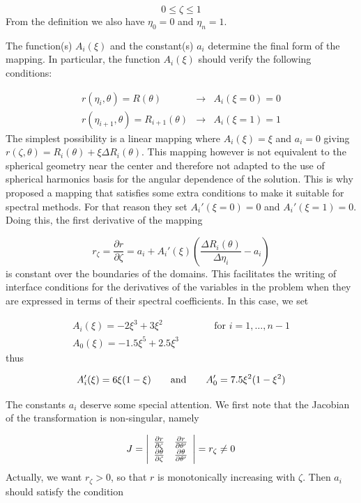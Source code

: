 \[ 0\leq \zeta\leq1\]
From the definition we also have $\eta_0=0$ and $\eta_n=1$.

The function(s) $A_i(\xi)$ and the constant(s) $a_i$ determine the final
form of the mapping. In particular, the function $A_i(\xi)$ should verify
the following conditions:

\begin{eqnarray*}
r(\eta_i,\theta)=R(\theta) &\longrightarrow& A_i(\xi=0)=0\\
r(\eta_{i+1},\theta)=R_{i+1}(\theta) &\longrightarrow& A_i(\xi=1)=1
\end{eqnarray*}
The simplest possibility is a linear mapping where $A_i(\xi)=\xi$ and
$a_i=0$ giving $ r(\zeta,\theta)=R_i(\theta)+\xi\Delta R_i(\theta)$.
This mapping however is not equivalent to the spherical geometry near
the center and therefore not adapted to the use of spherical harmonics
basis for the angular dependence of the solution. This is why 
\citet{BGM98} proposed a mapping that satisfies some
extra conditions to make it suitable for spectral methods. For that
reason they set $A_i'(\xi=0)=0$ and $A_i'(\xi=1)=0$. Doing this, the
first derivative of the mapping

\begin{equation}
r_\zeta=\frac{\partial r}{\partial\zeta}=a_i+A_i'(\xi)\left(\frac{\Delta R_i(\theta)}{\Delta\eta_i}-a_i\right)
\end{equation}
is constant over the boundaries of the domains. This facilitates the
writing of interface conditions for the derivatives of the variables
in the problem when they are expressed in terms of their spectral
coefficients.  In this case, we set

\begin{eqnarray}
\label{eq:map_bonazzola}
A_i(\xi)=-2\xi^3+3\xi^2 &\qquad& \mbox{for $i=1,\ldots,n-1$}\\
A_0(\xi)=-1.5\xi^5+2.5\xi^3&&\label{exp_a0}
\end{eqnarray}
thus

\begin{equation}
A'_i(\xi) = 6\xi(1-\xi) \qquad {\rm and}\qquad A'_0 = 7.5\xi^2(1-\xi^2)
\end{equation}

The constants $a_i$ deserve some special attention. We first note that
the Jacobian of the transformation  is non-singular, namely

\[ J=\left|\begin{array}{cc}
\frac{\partial r}{\partial \zeta} & \frac{\partial r}{\partial\theta'}\\
\frac{\partial \theta}{\partial \zeta} & \frac{\partial\theta}{\partial\theta'}
\end{array}\right| = r_\zeta\neq0\]
Actually, we want $r_\zeta>0$,
so that $r$ is monotonically increasing with $\zeta$. Then $a_i$
should satisfy the condition

